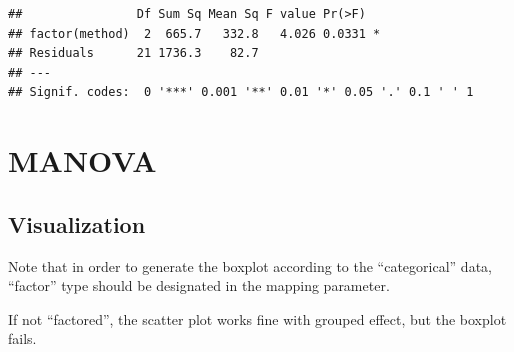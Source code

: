 \documentclass[
]{ctexart}
\newenvironment{Shaded}{\begin{snugshade}}{\end{snugshade}}
\newcommand{\CommentTok}[1]{\textcolor[rgb]{0.56,0.35,0.01}{\textit{#1}}}
\newcommand{\FunctionTok}[1]{\textcolor[rgb]{0.13,0.29,0.53}{\textbf{#1}}}
\newcommand{\NormalTok}[1]{#1}
\newcommand{\OtherTok}[1]{\textcolor[rgb]{0.56,0.35,0.01}{#1}}
\newcommand{\SpecialCharTok}[1]{\textcolor[rgb]{0.81,0.36,0.00}{\textbf{#1}}}
\newcommand{\StringTok}[1]{\textcolor[rgb]{0.31,0.60,0.02}{#1}}
\begin{document}
\begin{verbatim}
##                Df Sum Sq Mean Sq F value Pr(>F)  
## factor(method)  2  665.7   332.8   4.026 0.0331 *
## Residuals      21 1736.3    82.7                 
## ---
## Signif. codes:  0 '***' 0.001 '**' 0.01 '*' 0.05 '.' 0.1 ' ' 1
\end{verbatim}

\hypertarget{manova}{%
\section{MANOVA}\label{manova}}

\begin{Shaded}
\end{Shaded}

\hypertarget{visualization-1}{%
\subsection{Visualization}\label{visualization-1}}

Note that in order to generate the boxplot according to the
``categorical'' data, ``factor'' type should be designated in the
mapping parameter.

If not ``factored'', the scatter plot works fine with grouped effect,
but the boxplot fails.
\end{document}
